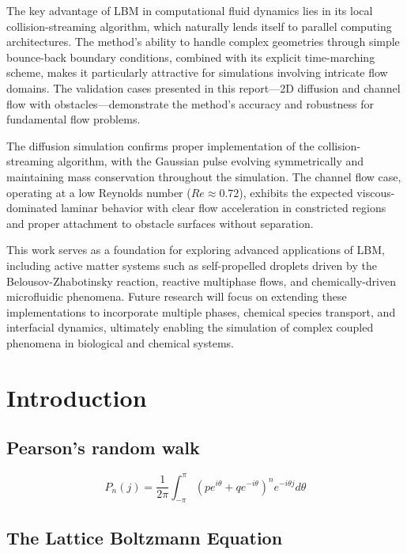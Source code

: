 \documentclass[12pt, a4paper]{report}
\begin{document}
The key advantage of LBM in computational fluid dynamics lies in its local collision-streaming algorithm, which naturally lends itself to parallel computing architectures. The method's ability to handle complex geometries through simple bounce-back boundary conditions, combined with its explicit time-marching scheme, makes it particularly attractive for simulations involving intricate flow domains. The validation cases presented in this report—2D diffusion and channel flow with obstacles—demonstrate the method's accuracy and robustness for fundamental flow problems.

The diffusion simulation confirms proper implementation of the collision-streaming algorithm, with the Gaussian pulse evolving symmetrically and maintaining mass conservation throughout the simulation. The channel flow case, operating at a low Reynolds number ($Re \approx 0.72$), exhibits the expected viscous-dominated laminar behavior with clear flow acceleration in constricted regions and proper attachment to obstacle surfaces without separation.

This work serves as a foundation for exploring advanced applications of LBM, including active matter systems such as self-propelled droplets driven by the Belousov-Zhabotinsky reaction, reactive multiphase flows, and chemically-driven microfluidic phenomena. Future research will focus on extending these implementations to incorporate multiple phases, chemical species transport, and interfacial dynamics, ultimately enabling the simulation of complex coupled phenomena in biological and chemical systems.

\clearpage
\addtocounter{page}{1}

\tableofcontents

\newpage
\setcounter{page}{1}


\chapter{Introduction}
\section{Pearson's random walk}
\begin{equation}
P_n(j) = \frac{1}{2\pi} \int_{-\pi}^{\pi} (pe^{i\theta} + qe^{-i\theta})^n e^{-i\theta j} d\theta
\end{equation}

\section{The Lattice Boltzmann Equation}
\printbibliography
\end{document}

